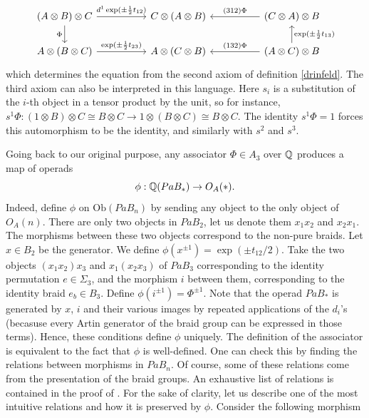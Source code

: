 \documentclass[TFM.tex]{subfiles}
\begin{document}
\[
\begin{tikzcd}[column sep=50]
(A\otimes B)\otimes C \arrow[r, "d^1\exp(\pm\frac{1}{2}t_{12})"] \arrow[d, "\Phi"'] & C\otimes (A\otimes B)   & (C\otimes A)\otimes B\arrow[l, "(312)\Phi"']  \\
A\otimes (B\otimes C) \arrow[r, "\exp(\pm\frac{1}{2}t_{23})"]                                    & A\otimes (C\otimes B) & (A\otimes C)\otimes B\arrow[l, "(132)\Phi"']\arrow[u, "\exp(\pm\frac{1}{2}t_{13})"']                         
\end{tikzcd}
\]
which determines the equation from the second axiom of definition \ref{drinfeld}. The third axiom can also be interpreted in this language. Here $s_i$ is a substitution of the $i$-th object in a tensor product by the unit, so for instance, $s^1\Phi:(1\otimes B)\otimes C\cong B\otimes C\to 1\otimes (B\otimes C)\cong B\otimes C$. The identity $s^1\Phi=1$ forces this automorphism to be the identity, and similarly with $s^2$ and $s^3$. 

Going back to our original purpose, any associator $\Phi\in A_3$ over $\mathbb{Q}$ produces a map of operads
\[
\phi:\mathbb{Q}(PaB_*)\to O_A(*).
\]
Indeed, define $\phi$ on $\mathrm{Ob}(PaB_n)$ by sending any object to the only object of $O_A(n)$.
There are only two objects in $PaB_2$, let us denote them $x_1x_2$ and $x_2x_1$. The morphisms
between these two objects correspond to the non-pure braids. Let $x\in B_2$
be the generator. We define $\phi(x^{\pm 1})=\exp(\pm t_{12}/2)$. Take the two objects $(x_1x_2)x_3$ and
$x_1(x_2x_3)$ of $PaB_3$ corresponding to the identity permutation $e \in \Sigma_3$, and the morphism
$i$ between them, corresponding to the identity braid $e_b\in B_3$. Define $\phi(i^{\pm 1})=\Phi^{\pm 1}$.
Note that the operad $PaB_*$ is generated by $x$, $i$ and their various images by repeated applications
of the $d_i$'s (becasuse every Artin generator of the braid group can be expressed in those terms). Hence, these conditions define $\phi$ uniquely. %
The definition of the associator is equivalent to the fact that $\phi$ is well-defined. One can check this by finding the relations between morphisms in $PaB_n$. Of course, some of these relations come from the presentation of the braid groups. An exhaustive list of relations is contained in the proof of  \cite[Proposition 3.4]{1deTamarkin}. For the sake of clarity, let us describe one of the most intuitive relations and how it is preserved by $\phi$. Consider the following morphism
\end{document}
